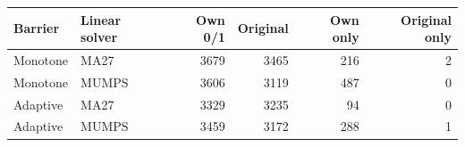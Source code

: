 \begin{tabular}{@{}llrrrr@{}}
\toprule
Barrier & Linear solver & Own 0/1 & Original & Own only & Original only\\
\midrule
Monotone & MA27 & 3679 & 3465 & 216 & 2\\
Monotone & MUMPS & 3606 & 3119 & 487 & 0\\
Adaptive & MA27 & 3329 & 3235 & 94 & 0\\
Adaptive & MUMPS & 3459 & 3172 & 288 & 1\\
\bottomrule
\end{tabular}

